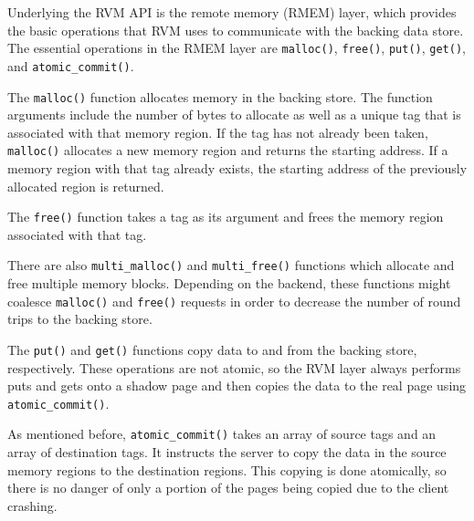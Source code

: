 Underlying the RVM API is the remote memory (RMEM) layer, which provides the
basic operations that RVM uses to communicate with the backing data store.
The essential operations in the RMEM layer are \texttt{malloc()},
\texttt{free()}, \texttt{put()}, \texttt{get()}, and \texttt{atomic\_commit()}.

The \texttt{malloc()} function allocates memory in the backing store.
The function arguments include the number of bytes to allocate as well as
a unique tag that is associated with that memory region. If the tag has not
already been taken, \texttt{malloc()} allocates a new memory region and returns
the starting address. If a memory region with that tag already exists, the
starting address of the previously allocated region is returned.

The \texttt{free()} function takes a tag as its argument and frees the memory
region associated with that tag.

There are also \texttt{multi\_malloc()} and \texttt{multi\_free()} functions
which allocate and free multiple memory blocks. Depending on the backend,
these functions might coalesce \texttt{malloc()} and \texttt{free()} requests
in order to decrease the number of round trips to the backing store.

The \texttt{put()} and \texttt{get()} functions copy data to and from the
backing store, respectively. These operations are not atomic, so the RVM
layer always performs puts and gets onto a shadow page and then copies the
data to the real page using \texttt{atomic\_commit()}.

As mentioned before, \texttt{atomic\_commit()} takes an array of source tags
and an array of destination tags. It instructs the server to copy the data
in the source memory regions to the destination regions. This copying is
done atomically, so there is no danger of only a portion of the pages
being copied due to the client crashing.
